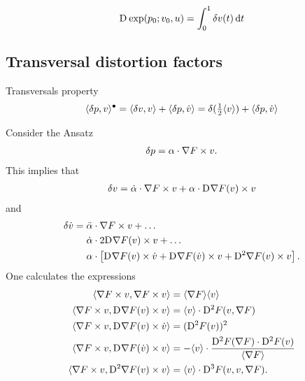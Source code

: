 \begin{align}
\mathrm{D}^{  } \exp( p_0; v_0, u )  =  \int^1_0 \delta v( t ) \,\mathrm{ d }{  t  }
\end{align}


\subsection{Transversal distortion factors}


Transversals property
\begin{align}
    \langle  \delta p ,  v  \rangle^\bullet  =
    \langle  \delta v ,  v  \rangle  +  \langle  \delta p ,  \dot{ v }  \rangle  =
    \delta( \tfrac12 \langle  v  \rangle )  +  \langle  \delta p ,  \dot{ v }  \rangle
\end{align}


Consider the Ansatz
\begin{align}
    \delta p  =  \alpha \cdot \nabla F  \times v .
\end{align}
This implies that
\begin{align}
    \delta v  =
    \dot{ \alpha } \cdot \nabla F  \times v  +
    \alpha \cdot \mathrm{D}^{  } \nabla F  ( v ) \times v
\end{align}
and
\begin{align}
    \delta \dot{ v }  &=
    \ddot{ \alpha } \mult \grad{ F } \times v  +  \dots\nonumber\\
    &\hphantom{{}={}}\dot{ \alpha } \mult 2 \diff{}{ \grad{ F } }( v ) \times v  +  \dots\nonumber\\
    &\hphantom{{}={}}\alpha \mult \left[ \diff{}{ \grad{ F } }( v ) \times \dot{ v }  +
    \diff{}{ \grad{ F } }( \dot{ v } ) \times v  +  
    \diff{ 2 }{ \grad{ F } }( v ) \times v \right] .
\end{align}
One calculates the expressions
\begin{subequations}
    \begin{align}
        \langle  \nabla F  \times v ,  \nabla F  \times v  \rangle  &=
        \langle  \nabla F   \rangle \langle  v  \rangle\\
        \langle  \nabla F  \times v ,  \mathrm{D}^{  } \nabla F  ( v ) \times v  \rangle  &=
        \langle  v  \rangle \cdot \mathrm{D}^{ 2 } F ( v, \nabla F  )\\
        \langle  \nabla F  \times v ,  \mathrm{D}^{  } \nabla F  ( v ) \times \dot{ v }  \rangle  &=
        ( \mathrm{D}^{ 2 } F ( v ) )^2\\
        \langle  \nabla F  \times v ,  \mathrm{D}^{  } \nabla F  ( \dot{ v } ) \times v  \rangle  &=
        -  \langle  v  \rangle \cdot \frac{ \mathrm{D}^{ 2 } F ( \nabla F  ) \cdot \mathrm{D}^{ 2 } F ( v ) }{ \langle  \nabla F   \rangle }\\
        \langle  \nabla F  \times v ,  \mathrm{D}^{ 2 } \nabla F  ( v ) \times v  \rangle  &=
        \langle  v  \rangle \cdot \mathrm{D}^{ 3 } F ( v, v, \nabla F  ) .
    \end{align}
\end{subequations}
